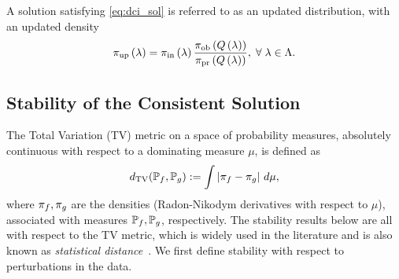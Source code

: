 \begin{defn}\label{defn:updated}
  A solution satisfying \eqref{eq:dci_sol} is referred to as an updated distribution, with an updated density
  \begin{equation}\label{eq:update}
    \operatorname*{\pi_{up}} \left ( \lambda \right ) = \operatorname*{\pi_{in}} \left ( \lambda \right ) \frac{\operatorname*{\pi_{ob}} \left ( Q\left ( \lambda \right ) \right ) }{\operatorname*{\pi_{pr}} \left ( Q\left ( \lambda \right ) \right ) }, \; \forall \; \lambda \in {\Lambda}.
  \end{equation}
\end{defn}




\subsection{Stability of the Consistent Solution}\label{sec:stability}
The Total Variation (TV) metric on a space of probability measures, absolutely continuous with respect to a dominating measure $\mu$, is defined as
\begin{equation}\label{eq:tv}
d_{\text{TV}} (\mathbb{P}_f, \mathbb{P}_g) := \int \left\vert\pi_f - \pi_g\right\vert \, d\mu,
\end{equation}
where $\pi_f,\pi_g$ are the densities (Radon-Nikodym derivatives with respect to $\mu$), associated with measures $\mathbb{P}_f, \mathbb{P}_g$, respectively.
The stability results below are all with respect to the TV metric, which is widely used in the literature and is also known as \emph{statistical distance}~\cite{GS02, Smith, Silverman}.
We first define stability with respect to perturbations in the data.

